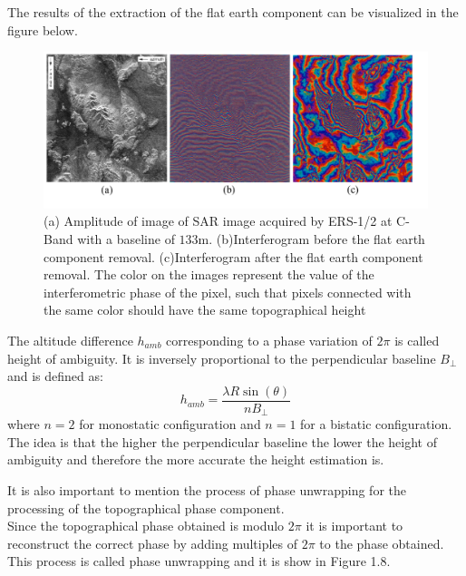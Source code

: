 The results of the extraction of the flat earth component can be visualized in the figure below.
\begin{figure}[H]
    \centering
    \includegraphics[width=\linewidth]{Cap1/flat_interf.png}
    \caption{(a) Amplitude of image of SAR image acquired by ERS-1/2 at C-Band with a baseline of $133$m.
    (b)Interferogram before the flat earth component removal. (c)Interferogram after the flat earth component removal. The color on the images represent the value of the interferometric phase of the pixel, such that pixels connected with the same color should have the same topographical height \cite{Paolathesis}}
    \label{fig:flat_earth_removal}
\end{figure}


The altitude difference $h_{amb}$ corresponding to a phase variation of $2\pi$ is called height of ambiguity. It is inversely proportional to the perpendicular baseline $B_{\perp}$ and is defined as:
\begin{equation}
    h_{amb} = \frac{\lambda R \sin(\theta)}{nB_{\perp}}
\end{equation}
where $n=2$ for monostatic configuration and $n=1$ for a bistatic configuration.
The idea is that the higher the perpendicular baseline the lower the height of ambiguity and therefore the more accurate the height estimation is.

It is also important to mention the process of phase unwrapping for the processing of the topographical phase component.\\
Since the topographical phase obtained is modulo $2\pi$ it is important to reconstruct the correct phase by adding multiples of $2\pi$ to the phase obtained. 
This process is called phase unwrapping and it is show in Figure 1.8.

